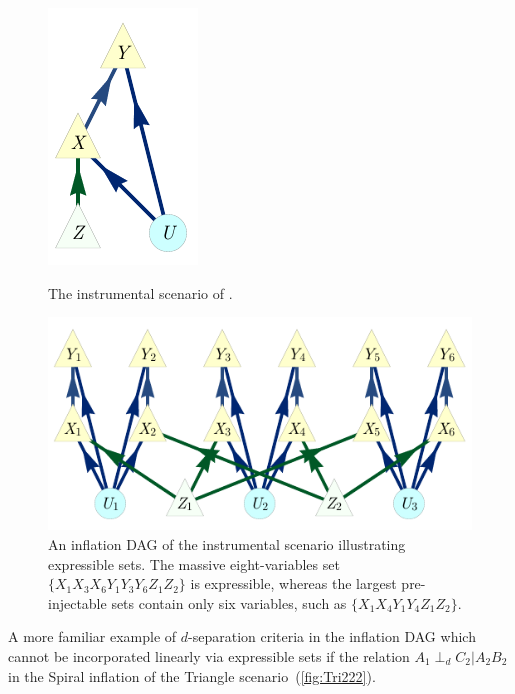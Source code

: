 \documentclass[aps,english,superscriptaddress,onecolumn,twoside,longbibliography,pra,floatfix,fleqn,nofootinbib]{revtex4-1}%
\theoremstyle{definition}
\newcounter{example}[section]
\newcommand{\aindep}{\ensuremath{\cramp{\perp_d}}} %
\newcommand{\cramp}[1]{\ensuremath{\mathord{#1}}}
\begin{document}
\begin{figure}[h]
    \centering
    \begin{minipage}[t]{0.22\linewidth}      \centering
    \includegraphics[scale=1]{ISorigDAG.pdf}
    \caption{The instrumental scenario of \citet{pearl1995instrumental}.}
    \label{fig:ISorigDAGdespexample}
    \end{minipage}\hfill
    \begin{minipage}[t]{0.75\linewidth}      \centering
    \includegraphics[scale=1]{ISsuperinflationDAG.pdf}
    \caption{An inflation DAG of the instrumental scenario illustrating expressible sets. The massive eight-variables set $\{X_1 X_3 X_6 Y_1 Y_3 Y_6 Z_1 Z_2\}$ is expressible, whereas the largest pre-injectable sets contain only six variables, such as $\{X_1 X_4 Y_1 Y_4 Z_1 Z_2\}$.}
    \label{fig:pearlsuperinflation}
    \end{minipage}
\end{figure}

A more familiar example of $d$-separation criteria in the inflation DAG which cannot be incorporated linearly via expressible sets if the relation $A_1\aindep C_2|A_2 B_2$ in the Spiral inflation of the Triangle scenario~(\cref{fig:Tri222}).
\end{document}
